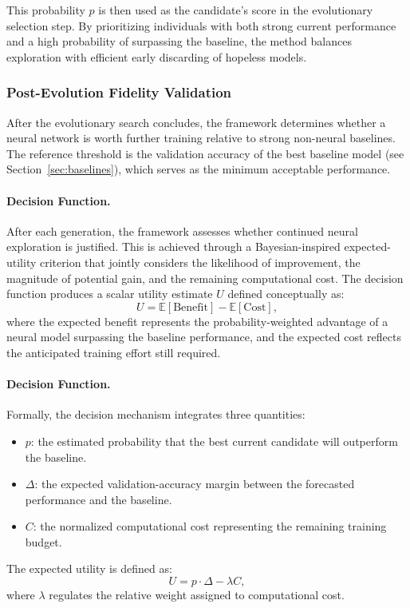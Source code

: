 \documentclass[stu,12pt,floatsintext,doublespacing]{apa7}
\begin{document}
This probability $p$ is then used as the candidate’s score in the evolutionary selection step. By prioritizing individuals with both strong current performance and a high probability of surpassing the baseline, the method balances exploration with efficient early discarding of hopeless models.


\subsubsection{Post-Evolution Fidelity Validation}
\label{sec:post_evolution}

After the evolutionary search concludes, the framework determines whether a neural network is worth further training relative to strong non-neural baselines. The reference threshold is the validation accuracy of the best baseline model (see Section~\ref{sec:baselines}), which serves as the minimum acceptable performance.
\paragraph{Decision Function.}
After each generation, the framework assesses whether continued neural exploration is justified. This is achieved through a Bayesian-inspired expected-utility criterion that jointly considers the likelihood of improvement, the magnitude of potential gain, and the remaining computational cost. The decision function produces a scalar utility estimate $U$ defined conceptually as:
\[
U = \mathbb{E}[\text{Benefit}] - \mathbb{E}[\text{Cost}],
\]
where the expected benefit represents the probability-weighted advantage of a neural model surpassing the baseline performance, and the expected cost reflects the anticipated training effort still required.  
\paragraph{Decision Function.}
Formally, the decision mechanism integrates three quantities:
\begin{itemize}
    \item $p$: the estimated probability that the best current candidate will outperform the baseline.
    \item $\Delta$: the expected validation-accuracy margin between the forecasted performance and the baseline.
    \item $C$: the normalized computational cost representing the remaining training budget.
\end{itemize}
The expected utility is defined as:
\[
U = p \cdot \Delta - \lambda C,
\]
where $\lambda$ regulates the relative weight assigned to computational cost.  
\end{document}

